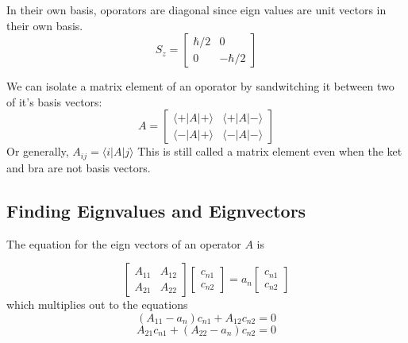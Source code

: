 \documentclass{homework}
\newcommand{\m}[1]{\begin{bmatrix} #1 \end{bmatrix}}
\newcommand{\kt}{\rangle}
\newcommand{\br}{\langle}
\begin{document}
In their own basis, oporators are diagonal since eign values are unit vectors in their own basis.
\[S_z = \m{\hbar/2 & 0 \\ 0 & -\hbar/2}\]

We can isolate a matrix element of an oporator by sandwitching it between two of it's basis vectors:
\[A = \m{\br + | A | + \kt & \br + | A | - \kt \\ \br - | A | + \kt & \br - | A | - \kt}\]
Or generally, $A_{ij} = \br i | A | j \kt$
This is still called a matrix element even when the ket and bra are not basis vectors.

\subsection{Finding Eignvalues and Eignvectors}

The equation for the eign vectors of an operator $A$ is 

\[\m{A_{11} & A_{12} \\ A_{21} & A_{22}}\m{c_{n1} \\ c_{n2}} = a_n \m{c_{n1} \\ c_{n2}}\]
which multiplies out to the equations
\[(A_{11} - a_n)c_{n1} + A_{12}c_{n2} = 0\]
\[A_{21}c_{n1}+ (A_{22}- a_n)c_{n2} = 0\]
\end{document}
